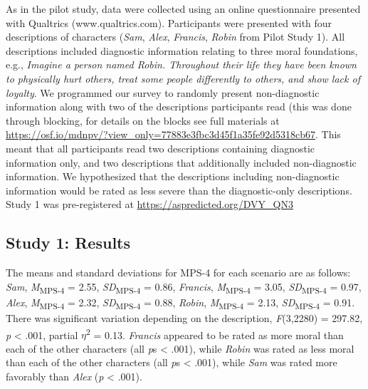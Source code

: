 \documentclass[
  man,floatsintext]{apa6}
\begin{document}
As in the pilot study, data were collected using an online questionnaire presented with Qualtrics (www.qualtrics.com). Participants were presented with four descriptions of characters (\emph{Sam}, \emph{Alex}, \emph{Francis}, \emph{Robin} from Pilot Study 1). All descriptions included diagnostic information relating to three moral foundations, e.g., \emph{Imagine a person named Robin. Throughout their life they have been known to physically hurt others, treat some people differently to others, and show lack of loyalty}. We programmed our survey to randomly present non-diagnostic information along with two of the descriptions participants read (this was done through blocking, for details on the blocks see full materials at \color{blue}\url{https://osf.io/mdnpv/?view_only=77883e3fbc3d45f1a35fe92d5318cb67}\color{black}. This meant that all participants read two descriptions containing diagnostic information only, and two descriptions that additionally included non-diagnostic information. We hypothesized that the descriptions including non-diagnostic information would be rated as less severe than the diagnostic-only descriptions. Study 1 was pre-registered at \color{blue}\url{https://aspredicted.org/DVY_QN3}\color{black}

\subsection{Study 1: Results}\label{study-1-results}

The means and standard deviations for MPS-4 for each scenario are as follows:
\emph{Sam},
\emph{M}\textsubscript{MPS-4} = 2.55, \emph{SD}\textsubscript{MPS-4} = 0.86,
\emph{Francis},
\emph{M}\textsubscript{MPS-4} = 3.05, \emph{SD}\textsubscript{MPS-4} = 0.97,
\emph{Alex},
\emph{M}\textsubscript{MPS-4} = 2.32, \emph{SD}\textsubscript{MPS-4} = 0.88,
\emph{Robin},
\emph{M}\textsubscript{MPS-4} = 2.13, \emph{SD}\textsubscript{MPS-4} = 0.91. There was significant variation depending on the description, \emph{F}(3,2280) = 297.82, \emph{p} \textless{} .001, partial \(\eta\)\textsuperscript{2} = 0.13. \emph{Francis} appeared to be rated as more moral than each of the other characters (all \emph{p}s \textless{} .001), while \emph{Robin} was rated as less moral than each of the other characters (all \emph{p}s \textless{} .001), while \emph{Sam} was rated more favorably than \emph{Alex} (\emph{p} \textless{} .001).
\end{document}
